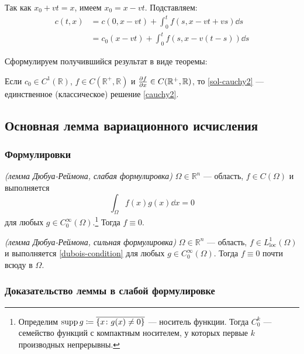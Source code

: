 Так как $x_0 + vt = x$, имеем $x_0 = x - vt$. Подставляем:
%
\begin{equation}
  \begin{aligned}
  c(t, x) &= c(0, x - vt) + \int_0^t f(s, x - vt + vs) \dd s\\
  &= c_0(x - vt) + \int_0^t f(s, x - v(t - s)) \dd s
  \end{aligned} \label{sol-cauchy2}
\end{equation}

Сформулируем получившийся результат в виде теоремы:
%
\begin{thm}
  Если $c_0 \in C^1(\mathbb{R})$, $f \in C(\mathbb{R}^+, \mathbb{R})$ и $\pdv{f}{x} \in C(\mathbb{R}^+, \mathbb{R})$, то \eqref{sol-cauchy2} --- единственное (классическое) решение \eqref{cauchy2}.
\end{thm}

\subsection{Основная лемма вариационного исчисления}

\subsubsection{Формулировки}

\begin{lem}\emph{(лемма Дюбуа-Реймона, слабая формулировка)}
  $\Omega \in \mathbb{R}^n$ --- область, $f \in C(\Omega)$ и выполняется \begin{equation}
    \int_\Omega f(x) g(x) \dd x = 0 \label{dubois-condition}
  \end{equation}
  для любых $g \in C_0^\infty(\Omega)$.\footnote{Определим $\operatorname{supp} g \coloneqq \overline{\{x \colon g(x) \neq 0 \}}$ --- носитель функции. Тогда $C_0^k$ --- семейство функций с компактным носителем, у которых первые $k$ производных непрерывны.} Тогда $f \equiv 0$.
\end{lem}

\begin{lem}\emph{(лемма Дюбуа-Реймона, сильная формулировка)}
  $\Omega \in \mathbb{R}^n$ --- область, {\color{red} $f \in L^1_{\mathrm{loc}}(\Omega)$} и выполняется \eqref{dubois-condition} для любых $g \in C_0^\infty(\Omega)$. Тогда $f \equiv 0$ {\color{red} почти всюду в $\Omega$}.
\end{lem}

\subsubsection{Доказательство леммы в слабой формулировке}

